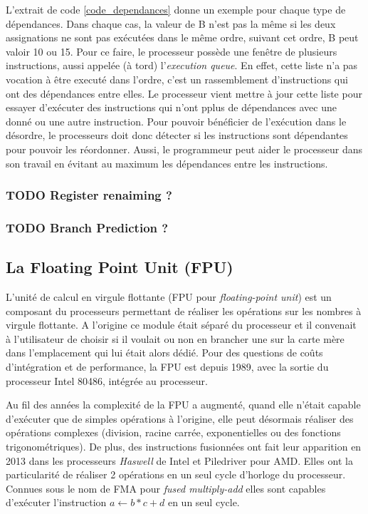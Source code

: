 L'extrait de code \ref{code_dependances} donne un exemple pour chaque type de dépendances. Dans chaque cas, la valeur de B n'est pas la même si les deux assignations ne sont pas exécutées dans le même ordre, suivant cet ordre, B peut valoir 10 ou 15. Pour ce faire, le processeur possède une fenêtre de plusieurs instructions, aussi appelée (à tord) l'\textit{execution queue}. En effet, cette liste n'a pas vocation à être executé dans l'ordre, c'est un rassemblement d'instructions qui ont des dépendances entre elles. Le processeur vient mettre à jour cette liste pour essayer d'exécuter des instructions qui n'ont pplus de dépendances avec une donné ou une autre instruction.
Pour pouvoir bénéficier de l'exécution dans le désordre, le processeurs doit donc détecter si les instructions sont dépendantes pour pouvoir les réordonner. Aussi, le programmeur peut aider le processeur dans son travail en évitant au maximum les dépendances entre les instructions. 

\subsubsection{TODO Register renaiming ?}


\subsubsection{TODO Branch Prediction ?}



\subsection{La Floating Point Unit (FPU)}

L'unité de calcul en virgule flottante (FPU pour \textit{floating-point  unit}) est un composant du processeurs permettant de réaliser les opérations sur les nombres à virgule flottante. A l'origine ce module était séparé du processeur et il convenait à l'utilisateur de choisir si il voulait ou non en brancher une sur la carte mère dans l'emplacement qui lui était alors dédié. Pour des questions de coûts d'intégration et de performance, la FPU est depuis 1989, avec la sortie du processeur Intel 80486,  intégrée au processeur. 

Au fil des années la complexité de la FPU a augmenté, quand elle n'était capable d'exécuter que de simples opérations à l'origine, elle peut désormais réaliser des opérations complexes (division, racine carrée, exponentielles ou des fonctions trigonométriques).  De plus, des instructions fusionnées ont fait leur apparition en 2013 dans les processeurs \textit{Haswell} de Intel et Piledriver pour AMD. Elles ont la particularité de réaliser 2 opérations en un seul cycle d'horloge du processeur. Connues sous le nom de FMA pour \textit{fused multiply-add} elles sont capables d'exécuter l'instruction $a \leftarrow b * c + d$ en un seul cycle. 

